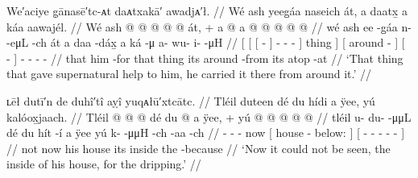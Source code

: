 \ex\label{ex:90-45-carry-suphelp-thing}%
%
\begingl
	\glpreamble	We′aciye g̣ānasē′tc-ᴀt daᴀtxakā′ awadjᴀ′ł. //
	\glpreamble	Wé ash yeeg̱áa naseich át, a daatx̱ a káa aawajél. //
	\gla	{} Wé
			{} {} ash  @ {} {}
				 @ {} @ {} @ {} @ {} {}
			át, {} +
		{} a  @ {} {}
		{} a  @ {} {}
		 @ {} @ {} @ {} @ {} //
	\glb	{} wé
			{} {} ash ee -g̱áa {}
				n-  -eμL -ch {} {}
			át {}
		{} a daa -dáx̱ {}
		{} a ká -μ {}
		a- wu- i-  -μH //
	\glc	{}[ 
			{}[ {}[   - {}]
				-  - - \· {}]
			thing {}]
		{}[  around - {}]
		{}[   - {}]
		- - -  - //
	\gld	{} that
			{} {} him {} -for {}
				 {} {} {} \·that {}
			thing {}
		{} its around -from {}
		{} its atop -at {}
		 {} {} {} {} //
	\glft	‘That thing that gave supernatural help to him, he carried it there from around it.’
		//
\endgl
\xe

\ex\label{ex:90-46-inside-cant-be-seen}%
%
\begingl
	\glpreamble	ʟēł dutī′n de duhî′tî aỵî yuqᴀłū′xtcātc. //
	\glpreamble	Tléil duteen dé du hídi a ÿee, yú kalóox̱jaach. //
	\gla	Tléil  @ {} @ {} @ {}
		dé
		{} du  @ {} a ÿee, {} +
		{} yú  @ {} @ {} @ {} @ {} @ {} {} //
	\glb	tléil u- du-  -μμL
		dé
		{} du hít -í a ÿee {}
		{} yú k-  -μμH -ch -aa -ch {} //
	\glc	{} - -  -
		now
		{}[  house -  below: {}]
		{}[  -  - - - - {}] //
	\gld	not  {} {} {}
		now
		{} his house {} its inside {}
		{} the  {} {} {} {} -because {} //
	\glft	‘Now it could not be seen, the inside of his house, for the dripping.’
		//
\endgl
\xe



